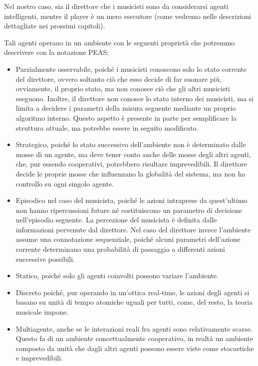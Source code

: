 Nel nostro caso, sia il direttore che i musicisti sono da considerarsi agenti intelligenti, mentre il player è un mero esecutore (come vedremo nelle descrizioni dettagliate nei prossimi capitoli).

Tali agenti operano in un ambiente con le seguenti proprietà che potremmo descrivere con la notazione PEAS;
\begin{itemize}
 \item Parzialmente osservabile, poiché i musicisti conoscono solo lo stato corrente del direttore, ovvero soltanto ciò che esso decide di far suonare più, ovviamente, il proprio stato, ma non conosce ciò che gli altri musicisti eseguono.
 Inoltre, il direttore non conosce lo stato interno dei musicisti, ma si limita a decidere i parametri della misura seguente mediante un proprio algoritmo interno.
 Questo aspetto è presente in parte per semplificare la struttura attuale, ma potrebbe essere in seguito modificato.
 \item Strategico, poiché lo stato successivo dell'ambiente non è determinato dalle mosse di un agente, ma deve tener conto anche delle mosse degli altri agenti, che, pur essendo cooperativi, potrebbero risultare imprevedibili.
 Il direttore decide le proprie mosse che influenzano la globalità del sistema, ma non ha controllo su ogni singolo agente.
 \item Episodico nel caso del musicista, poiché le azioni intraprese da quest'ultimo non hanno ripercussioni future né costituiscono un parametro di decisione nell'episodio seguente.
 La percezione del musicista è definita dalle informazioni pervenute dal direttore.
 Nel caso del direttore invece l'ambiente assume una connotazione sequenziale, poiché alcuni parametri dell'azione corrente determinano una probabilità di passaggio a differenti azioni successive possibili.
 \item Statico, poiché solo gli agenti coinvolti possono variare l'ambiente.
 \item Discreto poiché, pur operando in un'ottica real-time, le azioni degli agenti si basano su unità di tempo atomiche uguali per tutti, come, del resto, la teoria musicale impone.
 \item Multiagente, anche se le interazioni reali fra agenti sono relativamente scarse. Questo fa di un ambiente concettualmente cooperativo, in realtà un ambiente composto da unità che dagli altri agenti possono essere viste come stocastiche e imprevedibili.
 \end{itemize}

